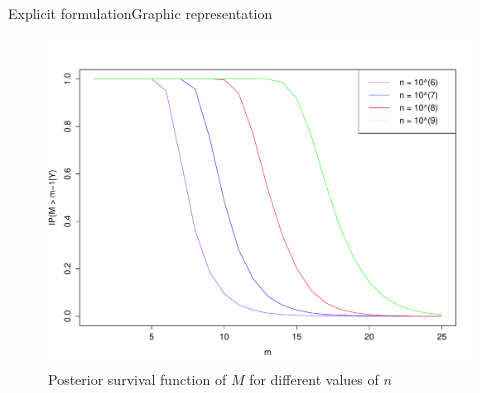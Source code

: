 \documentclass[10pt]{beamer}
\begin{document}
\begin{frame}{Explicit formulation}{Graphic representation}
\begin{figure}
\centering
 \includegraphics[width=.8\linewidth]{M.pdf}
\caption{Posterior survival function of $M$ for different values of $n$}\label{M}
\end{figure}
\end{frame}
%
\end{document}

